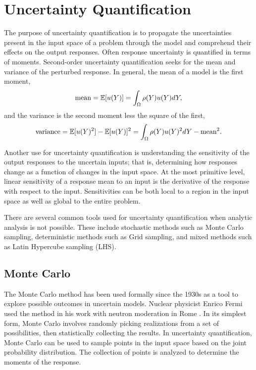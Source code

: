 \section{Uncertainty Quantification}
The purpose of uncertainty quantification is to propagate the uncertainties present in the input space of a
problem through the model and comprehend their effects on the output responses.  Often response uncertainty is
quantified in terms of moments.  Second-order uncertainty quantification seeks for the mean and variance of
the perturbed response.  In general, the mean of a model is the first moment,
\begin{equation}
  \text{mean} = \mathbb{E}[ u(Y)] = \int_\Omega \rho(Y) u(Y) dY,
\end{equation}
and the variance is the second moment less the square of the first,
\begin{equation}
  \text{variance} = \mathbb{E}[ u(Y)^2] - \mathbb{E}[ u(Y)]^2 = \int_\Omega \rho(Y) u(Y)^2 dY - \text{mean}^2.
\end{equation}

Another use for uncertainty quantification is understanding the sensitivity of the output responses to the
uncertain inputs; that is, determining how responses change as a function of changes in the input space.  At
the most primitive level, linear sensitivity of a response mean to an input is the derivative of the response
with respect to the input.  Sensitivities can be both local to a region in the input space as well as global
to the entire problem.

There are several common tools used for uncertainty quantification when analytic analysis is not possible.
These include stochastic methods such as Monte Carlo sampling, deterministic methods such as Grid sampling,
and mixed methods such as Latin Hypercube sampling (LHS).

\subsection{Monte Carlo}
The Monte Carlo method \cite{mc} has been used formally since the 1930s as a tool to explore possible outcomes
in uncertain models.  Nuclear physicist Enrico Fermi used the method in his work with neutron moderation in
Rome \cite{mcfermi}.  In its simplest form, Monte Carlo involves randomly picking realizations from a set of
possibilities, then statistically collecting the results.  In uncertainty quantification, Monte Carlo can be
used to sample points in the input space based on the joint probability distribution.  The collection of
points is analyzed to determine the moments of the response.

